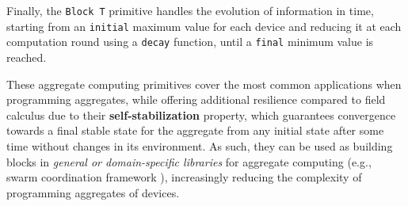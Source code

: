 Finally, the \texttt{Block T} primitive handles the evolution of information in
time, starting from an \texttt{initial} maximum value for each device and
reducing it at each computation round using a \texttt{decay} function, until a
\texttt{final} minimum value is reached.

These aggregate computing primitives cover the most common applications when
programming aggregates, while offering additional resilience compared to field
calculus due to their \textbf{self-stabilization} property, which guarantees
convergence towards a final stable state for the aggregate from any initial
state after some time without changes in its environment. As such, they can be
used as building blocks in \textit{general or domain-specific libraries} for
aggregate computing (e.g., swarm coordination framework \cite{MacroSwarm}),
increasingly reducing the complexity of programming aggregates of devices.